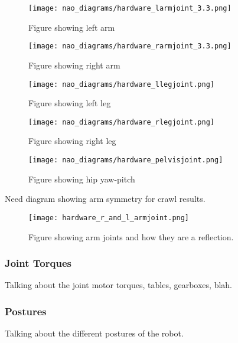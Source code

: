 \begin{figure}
\centering
\texttt{[image: nao\_diagrams/hardware\_larmjoint\_3.3.png]}
\caption{Figure showing left arm}
\label{fig:nao_arm_joints_left1}
\end{figure}

\begin{figure}
\centering
\texttt{[image: nao\_diagrams/hardware\_rarmjoint\_3.3.png]}
\caption{Figure showing right arm}
\label{fig:nao_arm_joints_right1}
\end{figure}

\begin{figure}
\centering
\texttt{[image: nao\_diagrams/hardware\_llegjoint.png]}
\caption{Figure showing left leg}
\label{fig:nao_leg_joints_left1}
\end{figure}

\begin{figure}
\centering
\texttt{[image: nao\_diagrams/hardware\_rlegjoint.png]}
\caption{Figure showing right leg}
\label{fig:nao_leg_joints_right1}
\end{figure}

\begin{figure}
\centering
\texttt{[image: nao\_diagrams/hardware\_pelvisjoint.png]}
\caption{Figure showing hip yaw-pitch}
\label{fig:nao_hip_yawpitch1}
\end{figure}


Need diagram showing arm symmetry for crawl results. 
\begin{figure}
\centering
\texttt{[image: hardware\_r\_and\_l\_armjoint.png]}
\caption{Figure showing arm joints and how they are a reflection.}
\label{fig:nao_arm_joints_reflect1}
\end{figure}

\subsubsection{Joint Torques}
Talking about the joint motor torques, tables, gearboxes, blah.

\subsubsection{Postures}
Talking about the different postures of the robot.


